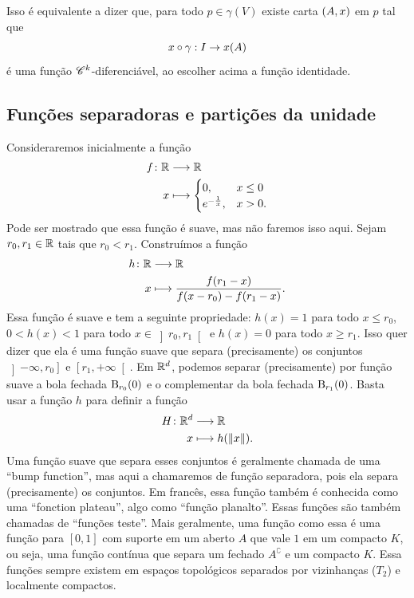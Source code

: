 Isso é equivalente a dizer que, para todo $p \in \gamma(V)$ existe carta $(A,x)$ em $p$ tal que
	\begin{equation*}
	x \circ \gamma: I \to x(A)
	\end{equation*}
é uma função $\mathscr{C}^k$-diferenciável, ao escolher acima a função identidade.

\subsection{Funções separadoras e partições da unidade}

Consideraremos inicialmente a função
	\begin{align*}
	{f}\colon {\mathbb{R}} &\longrightarrow {\mathbb{R}} \\{x} &\longmapsto \begin{cases}
		0,& x \leq 0 \\
		e^{-\frac{1}{x}},& x > 0.
	\end{cases}
	\end{align*}
Pode ser mostrado que essa função é suave, mas não faremos isso aqui. Sejam $r_0,r_1 \in \mathbb{R}$ tais que $r_0 < r_1$. Construímos a função
	\begin{align*}
	{h}\colon {\mathbb{R}} &\longrightarrow {\mathbb{R}} \\{x} &\longmapsto \frac{f(r_1-x)}{f(x-r_0)-f(r_1-x)}.
	\end{align*}
Essa função é suave e tem a seguinte propriedade: $h(x)=1$ para todo $x \leq r_0$, $0 < h(x) < 1$ para todo $x \in \left ]r_0, r_1\right [$ e $h(x)=0$ para todo $x \geq r_1$. Isso quer dizer que ela é uma função suave que separa (precisamente) os conjuntos $\left ]-\infty,r_0\right ]$ e $\left [r_1,+\infty\right [$. Em $\mathbb{R}^d$, podemos separar (precisamente) por função suave a bola fechada $\mathrm{B}_{r_0}(0)$ e o complementar da bola fechada $\mathrm{B}_{r_1}(0)$. Basta usar a função $h$ para definir a função%
	\begin{align*}
	{H}\colon {\mathbb{R}^d} &\longrightarrow {\mathbb{R}} \\{x} &\longmapsto h(\left\Vert{x}\right\Vert).
	\end{align*}
Uma função suave que separa esses conjuntos é geralmente chamada de uma ``bump function'', mas aqui a chamaremos de função separadora, pois ela separa (precisamente) os conjuntos. Em francês, essa função também é conhecida como uma ``fonction plateau'', algo como ``função planalto''. Essas funções são também chamadas de ``funções teste''.
Mais geralmente, uma função como essa é uma função para $[0,1]$ com suporte em um aberto $A$ que vale $1$ em um compacto $K$, ou seja, uma função contínua que separa um fechado $A^\complement$ e um compacto $K$. Essa funções sempre existem em espaços topológicos separados por vizinhanças ($T_2$) e localmente compactos.

